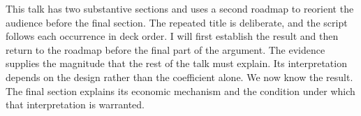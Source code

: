 \documentclass{article}
\newcommand{\scriptopening}[2]{#2}
\newcommand{\scriptframe}[3]{#3}
\newcommand{\Click}[1]{}
\begin{document}
\scriptopening{0.3 min}{%
  This talk has two substantive sections and uses a second roadmap to
  reorient the audience before the final section. The repeated title is
  deliberate, and the script follows each occurrence in deck order.}
\scriptframe{Roadmap}{0.2 min}{%
  I will first establish the result and then return to the roadmap before the
  final part of the argument.}
\scriptframe{Evidence}{0.3 min}{%
  The evidence supplies the magnitude that the rest of the talk must explain.
  Its interpretation depends on the design rather than the coefficient alone.}
\scriptframe{Roadmap}{0.2 min}{%
  We now know the result. \Click{2} The final section explains its economic
  mechanism and the condition under which that interpretation is warranted.}
\end{document}
